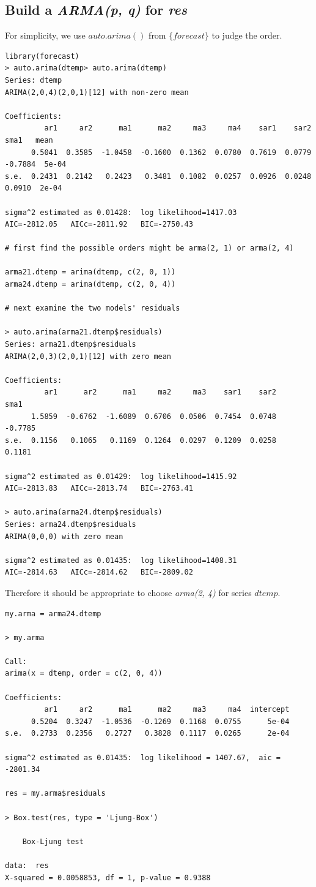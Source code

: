\documentclass[a4paper, 11pt]{article}
\begin{document}
\subsection{Build a \textit{ARMA(p, q)} for \textit{res}}
For simplicity, we use $auto.arima()$ from $\{forecast\}$ to judge the order.
\begin{verbatim}
library(forecast)
> auto.arima(dtemp> auto.arima(dtemp)
Series: dtemp 
ARIMA(2,0,4)(2,0,1)[12] with non-zero mean 

Coefficients:
         ar1     ar2      ma1      ma2     ma3     ma4    sar1    sar2     sma1   mean
      0.5041  0.3585  -1.0458  -0.1600  0.1362  0.0780  0.7619  0.0779  -0.7884  5e-04
s.e.  0.2431  0.2142   0.2423   0.3481  0.1082  0.0257  0.0926  0.0248   0.0910  2e-04

sigma^2 estimated as 0.01428:  log likelihood=1417.03
AIC=-2812.05   AICc=-2811.92   BIC=-2750.43

# first find the possible orders might be arma(2, 1) or arma(2, 4)

arma21.dtemp = arima(dtemp, c(2, 0, 1))
arma24.dtemp = arima(dtemp, c(2, 0, 4))

# next examine the two models' residuals

> auto.arima(arma21.dtemp$residuals)
Series: arma21.dtemp$residuals 
ARIMA(2,0,3)(2,0,1)[12] with zero mean     

Coefficients:
         ar1      ar2      ma1     ma2     ma3    sar1    sar2     sma1
      1.5859  -0.6762  -1.6089  0.6706  0.0506  0.7454  0.0748  -0.7785
s.e.  0.1156   0.1065   0.1169  0.1264  0.0297  0.1209  0.0258   0.1181

sigma^2 estimated as 0.01429:  log likelihood=1415.92
AIC=-2813.83   AICc=-2813.74   BIC=-2763.41

> auto.arima(arma24.dtemp$residuals)
Series: arma24.dtemp$residuals 
ARIMA(0,0,0) with zero mean     

sigma^2 estimated as 0.01435:  log likelihood=1408.31
AIC=-2814.63   AICc=-2814.62   BIC=-2809.02
\end{verbatim}
\indent Therefore it should be appropriate to choose \textit{arma(2, 4)} for series $dtemp$.

\begin{verbatim}
my.arma = arma24.dtemp

> my.arma

Call:
arima(x = dtemp, order = c(2, 0, 4))

Coefficients:
         ar1     ar2      ma1      ma2     ma3     ma4  intercept
      0.5204  0.3247  -1.0536  -0.1269  0.1168  0.0755      5e-04
s.e.  0.2733  0.2356   0.2727   0.3828  0.1117  0.0265      2e-04

sigma^2 estimated as 0.01435:  log likelihood = 1407.67,  aic = -2801.34

res = my.arma$residuals

> Box.test(res, type = 'Ljung-Box')

	Box-Ljung test

data:  res
X-squared = 0.0058853, df = 1, p-value = 0.9388
\end{verbatim}
\end{document}
